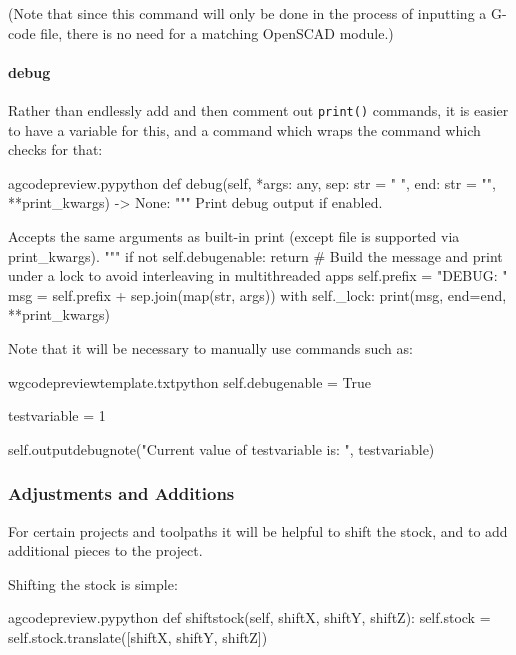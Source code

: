 \documentclass{ltxdoc}
\begin{document}
\noindent (Note that since this command will only be done in the process of inputting a G-code file, there is no need for a matching OpenSCAD module.)

\paragraph{debug}

Rather than endlessly add and then comment out \verb|print()| commands, it is easier to have a variable for this, and a command which wraps the command which checks for that:

\lstset{firstnumber=\thegcpy}
\begin{writecode}{a}{gcodepreview.py}{python}
    def debug(self, *args: any, sep: str = " ", end: str = "\n", **print_kwargs) -> None:
        """
        Print debug output if enabled.

        Accepts the same arguments as built-in print (except file is supported via print_kwargs).
        """
        if not self.debugenable:
            return
        # Build the message and print under a lock to avoid interleaving in multithreaded apps
        self.prefix = "DEBUG: "
        msg = self.prefix + sep.join(map(str, args))
        with self._lock:
            print(msg, end=end, **print_kwargs)
        
\end{writecode}
\addtocounter{gcpy}{14}

\noindent Note that it will be necessary to manually use commands such as:

\lstset{firstnumber=\thegcptmpl}
\begin{writecode}{w}{gcodepreviewtemplate.txt}{python}
self.debugenable = True

testvariable = 1

self.outputdebugnote("Current value of testvariable is: ", testvariable)

\end{writecode}
\addtocounter{gcptmpl}{6}

\subsubsection{Adjustments and Additions}

For certain projects and toolpaths it will be helpful to shift the stock, and to add additional pieces to the project.

Shifting the stock is simple:

\lstset{firstnumber=\thegcpy}
\begin{writecode}{a}{gcodepreview.py}{python}
    def shiftstock(self, shiftX, shiftY, shiftZ):
         self.stock = self.stock.translate([shiftX, shiftY, shiftZ])
        
\end{writecode}
\addtocounter{gcpy}{3}
\end{document}
